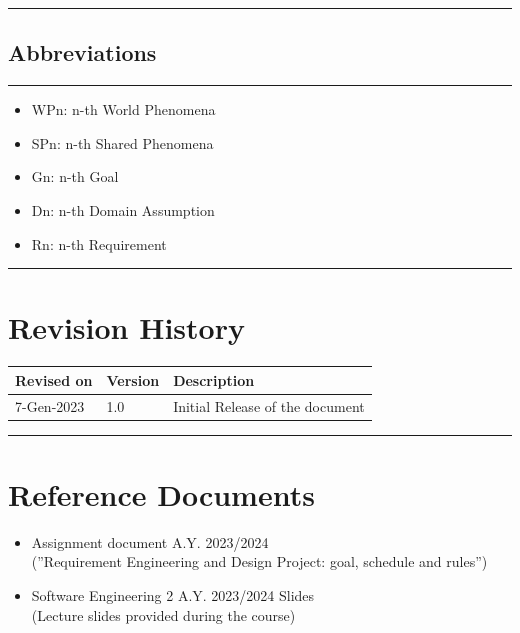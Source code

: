 \documentclass{Configuration_Files/Template}
\begin{document}
{\color{bluepoli}\rule{\linewidth}{0.1pt}}

\subsection{Abbreviations}

{\color{bluepoli}\rule{\linewidth}{0.1pt}}

\begin{itemize}
\item \textcolor{bluepoli}{WPn:} n-th World Phenomena
\item \textcolor{bluepoli}{SPn:} n-th Shared Phenomena
\item \textcolor{bluepoli}{Gn:} n-th Goal
\item \textcolor{bluepoli}{Dn:} n-th Domain Assumption
\item \textcolor{bluepoli}{Rn:} n-th Requirement
\end{itemize}

{\color{bluepoli}\rule{\linewidth}{0.1pt}}

\section{Revision History}

\noindent
\begin{tabularx}{\textwidth}{llX}
    \toprule
    Revised on & Version & Description \\
    \midrule
    7-Gen-2023 & 1.0 & Initial Release of the document \\
    \bottomrule
\end{tabularx}
\vspace{0.33pt}

{\color{bluepoli}\rule{\linewidth}{0.1pt}}

\section{Reference Documents}

\begin{itemize}
\item \textcolor{bluepoli}{Assignment document A.Y. 2023/2024}\\
(”Requirement Engineering and Design Project: goal, schedule and rules”)
\item \textcolor{bluepoli}{Software Engineering 2 A.Y. 2023/2024 Slides}\\
(Lecture slides provided during the course)
\end{itemize}
\end{document}
